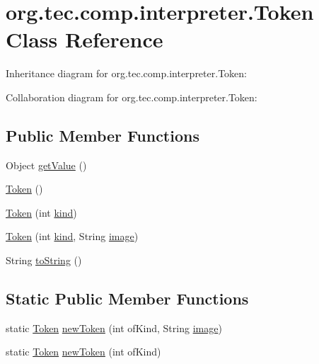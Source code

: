\hypertarget{classorg_1_1tec_1_1comp_1_1interpreter_1_1_token}{}\section{org.\+tec.\+comp.\+interpreter.\+Token Class Reference}
\label{classorg_1_1tec_1_1comp_1_1interpreter_1_1_token}


Inheritance diagram for org.\+tec.\+comp.\+interpreter.\+Token\+:


Collaboration diagram for org.\+tec.\+comp.\+interpreter.\+Token\+:
\subsection*{Public Member Functions}
\begin{DoxyCompactItemize}
\item 
Object \mbox{\hyperlink{classorg_1_1tec_1_1comp_1_1interpreter_1_1_token_adda9288eca7f330e9f34ddf78ee3d612}{get\+Value}} ()
\item 
\mbox{\hyperlink{classorg_1_1tec_1_1comp_1_1interpreter_1_1_token_a14d0d767b5afa4ac4b55e2fbed415ded}{Token}} ()
\item 
\mbox{\hyperlink{classorg_1_1tec_1_1comp_1_1interpreter_1_1_token_a3c4142753b4493ff86b2b466bc10e821}{Token}} (int \mbox{\hyperlink{classorg_1_1tec_1_1comp_1_1interpreter_1_1_token_a94909210d1760411e4901243abdb4fc2}{kind}})
\item 
\mbox{\hyperlink{classorg_1_1tec_1_1comp_1_1interpreter_1_1_token_a7214177c568cccfbeb98f456ddf49580}{Token}} (int \mbox{\hyperlink{classorg_1_1tec_1_1comp_1_1interpreter_1_1_token_a94909210d1760411e4901243abdb4fc2}{kind}}, String \mbox{\hyperlink{classorg_1_1tec_1_1comp_1_1interpreter_1_1_token_a19f4df05af50682f05314b00c906a0ff}{image}})
\item 
String \mbox{\hyperlink{classorg_1_1tec_1_1comp_1_1interpreter_1_1_token_af3fcfaa2b6ae489ce87fe6674cfa6cff}{to\+String}} ()
\end{DoxyCompactItemize}
\subsection*{Static Public Member Functions}
\begin{DoxyCompactItemize}
\item 
static \mbox{\hyperlink{classorg_1_1tec_1_1comp_1_1interpreter_1_1_token}{Token}} \mbox{\hyperlink{classorg_1_1tec_1_1comp_1_1interpreter_1_1_token_a50b3408b27556c1a3958c71bc8b219ff}{new\+Token}} (int of\+Kind, String \mbox{\hyperlink{classorg_1_1tec_1_1comp_1_1interpreter_1_1_token_a19f4df05af50682f05314b00c906a0ff}{image}})
\item 
static \mbox{\hyperlink{classorg_1_1tec_1_1comp_1_1interpreter_1_1_token}{Token}} \mbox{\hyperlink{classorg_1_1tec_1_1comp_1_1interpreter_1_1_token_a7e062a84523ba6b2ee404699c3d15403}{new\+Token}} (int of\+Kind)
\end{DoxyCompactItemize}
